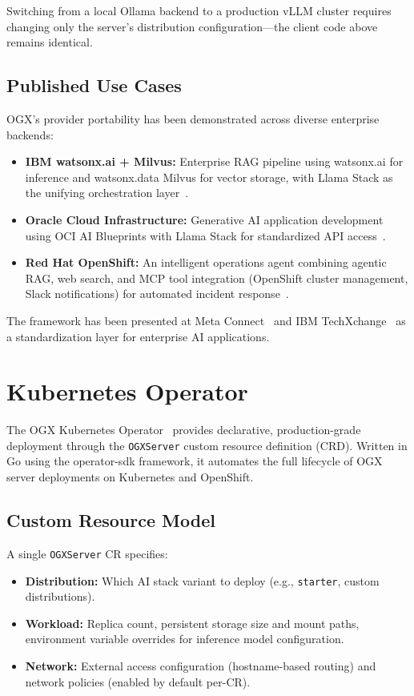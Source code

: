 \documentclass[11pt]{article}
\begin{document}
Switching from a local Ollama backend to a production vLLM cluster requires changing only the server's distribution configuration---the client code above remains identical.

\subsection{Published Use Cases}

OGX's provider portability has been demonstrated across diverse enterprise backends:

\begin{itemize}[nosep]
  \item \textbf{IBM watsonx.ai + Milvus:} Enterprise RAG pipeline using watsonx.ai for inference and watsonx.data Milvus for vector storage, with Llama Stack as the unifying orchestration layer~\cite{ibm_rag_milvus}.
  \item \textbf{Oracle Cloud Infrastructure:} Generative AI application development using OCI AI Blueprints with Llama Stack for standardized API access~\cite{oracle_oci_ogx}.
  \item \textbf{Red Hat OpenShift:} An intelligent operations agent combining agentic RAG, web search, and MCP tool integration (OpenShift cluster management, Slack notifications) for automated incident response~\cite{redhat_ops_agent}.
\end{itemize}

The framework has been presented at Meta Connect~\cite{meta_connect_ogx} and IBM TechXchange~\cite{ibm_techxchange_ogx} as a standardization layer for enterprise AI applications.

\section{Kubernetes Operator}
\label{sec:operator}

The OGX Kubernetes Operator~\cite{ogxk8soperator} provides declarative, production-grade deployment through the \texttt{OGXServer} custom resource definition (CRD). Written in Go using the operator-sdk framework, it automates the full lifecycle of OGX server deployments on Kubernetes and OpenShift.

\subsection{Custom Resource Model}

A single \texttt{OGXServer} CR specifies:
\begin{itemize}[nosep]
  \item \textbf{Distribution:} Which AI stack variant to deploy (e.g., \texttt{starter}, custom distributions).
  \item \textbf{Workload:} Replica count, persistent storage size and mount paths, environment variable overrides for inference model configuration.
  \item \textbf{Network:} External access configuration (hostname-based routing) and network policies (enabled by default per-CR).
\end{itemize}
\end{document}
